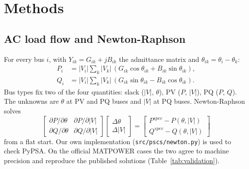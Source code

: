 \documentclass[11pt,a4paper]{article}
\begin{document}
\section{Methods}

\subsection{AC load flow and Newton-Raphson}
For every bus $i$, with $Y_{ik} = G_{ik} + jB_{ik}$ the admittance matrix and
$\theta_{ik} = \theta_i - \theta_k$:
\begin{align}
P_i &= |V_i|\sum_k |V_k|\,(G_{ik}\cos\theta_{ik} + B_{ik}\sin\theta_{ik}),\\
Q_i &= |V_i|\sum_k |V_k|\,(G_{ik}\sin\theta_{ik} - B_{ik}\cos\theta_{ik}).
\end{align}
Bus types fix two of the four quantities: slack ($|V|$, $\theta$), PV ($P$, $|V|$), PQ ($P$, $Q$).
The unknowns are $\theta$ at PV and PQ buses and $|V|$ at PQ buses. Newton-Raphson solves
\begin{equation}
\begin{bmatrix} \partial P/\partial\theta & \partial P/\partial |V| \\ \partial Q/\partial\theta & \partial Q/\partial|V|\end{bmatrix}
\begin{bmatrix}\Delta\theta \\ \Delta|V|\end{bmatrix} =
\begin{bmatrix} P^{spec} - P(\theta,|V|) \\ Q^{spec} - Q(\theta,|V|)\end{bmatrix}
\end{equation}
from a flat start. Our own implementation (\texttt{src/pscs/newton.py}) is used to check
PyPSA. On the official MATPOWER cases the two agree to machine precision and reproduce the
published solutions (Table~\ref{tab:validation}).

\begin{table}[htbp]\centering\small
\caption{Validation of the PyPSA models.}\label{tab:validation}
\end{table}
\end{document}
